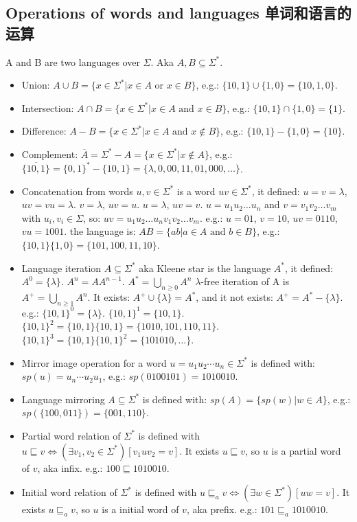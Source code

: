 \documentclass[a4paper,11pt,utf8]{article}
\begin{document}
\subsection{Operations of words and languages 单词和语言的运算}
A and B are two languages over $\Sigma$. Aka $A,B \subseteq \Sigma^*$.
\begin{itemize}
    \item Union: $A \cup B = \{x \in \Sigma^* | x \in A \text{ or } x \in B\}$, e.g.: $\{10,1\} \cup \{1,0\} = \{10,1,0\}$.
    \item Intersection: $A \cap B = \{x \in \Sigma^* | x \in A \text{ and } x \in B\}$, e.g.: $\{10,1\} \cap \{1,0\} = \{1\}$.
    \item Difference: $A - B = \{x \in \Sigma^* | x \in A \text{ and } x \notin B\}$, e.g.: $\{10,1\} - \{1,0\} = \{10\}$.
    \item Complement: $\overline{A} = \Sigma^* - A = \{x \in \Sigma^* | x \notin A\}$, e.g.: $\overline{\{10,1\}} = \{0,1\}^* - \{10,1\} = \{\lambda,0,00,11,01,000, \dots\}$.
    \item Concatenation from words $u,v \in \Sigma^*$ is a word $uv \in \Sigma^*$, it defined:
    \subitem $u=v=\lambda$, $uv=vu=\lambda$.
    \subitem $v=\lambda$, $uv=u$.
    \subitem $u=\lambda$, $uv=v$.
    \subitem $u=u_1 u_2 \dots u_n$ and $v=v_1 v_2 \dots v_m$ with $u_i,v_i \in \Sigma$, so: $uv = u_1 u_2 \dots u_n v_1 v_2 \dots v_m$.
    \subitem e.g.: $u=01$, $v=10$, $uv=0110$, $vu=1001$.
    \subitem the language is: $AB = \{ab | a \in A \text{ and } b \in B\}$, e.g.: $\{10,1\}\{1,0\} = \{101,100,11,10\}$.
    \item Language iteration $A \subseteq \Sigma^*$ aka Kleene star is the language $A^*$, it defined: 
    \subitem $A^0 = \{\lambda\}$.
    \subitem $A^n = AA^{n-1}$.
    \subitem $A^* = \bigcup_{n \geq 0} A^n$
    \subitem $\lambda$-free iteration of A is $A^+ = \bigcup_{n \geq 1} A^n$.
    \subitem It exists: $A^+ \cup \{\lambda\} = A^*$, and it not exists: $A^+ = A^* - \{\lambda\}$.
    \subitem e.g.:
    \subitem $\{10,1\}^0 = \{\lambda\}$.
    \subitem $\{10,1\}^1 = \{10,1\}$.
    \subitem $\{10,1\}^2 = \{10,1\}\{10,1\} = \{1010,101,110,11\}$.
    \subitem $\{10,1\}^3 = \{10,1\}\{10,1\}^2 = \{101010, \dots\}$.
    \item Mirror image operation for a word $u = u_1 u_2 \cdots u_n \in \Sigma^*$ is defined with: $sp(u) = u_n \cdots u_2 u_1$, e.g.: $sp(0100101) = 1010010$.
    \item Language mirroring $A \subseteq \Sigma^*$ is defined with: $sp(A) = \{sp(w)|w \in A\}$, e.g.: $sp(\{100,011\}) = \{001,110\}$.
    \item Partial word relation of $\Sigma^*$ is defined with $u \sqsubseteq v \Longleftrightarrow (\exists v_1,v_2 \in \Sigma^*)[v_1 u v_2 = v]$.
    \subitem It exists $u \sqsubseteq v$, so $u$ is a partial word of $v$, aka infix. e.g.: $100 \sqsubseteq 1010010$.
    \item Initial word relation of $\Sigma^*$ is defined with $u \sqsubseteq_a v \Longleftrightarrow (\exists w \in \Sigma^*)[uw = v]$.
    \subitem It exists $u \sqsubseteq_a v$, so $u$ is a initial word of $v$, aka prefix. e.g.: $101 \sqsubseteq_a 1010010$.
\end{itemize}
\end{document}
